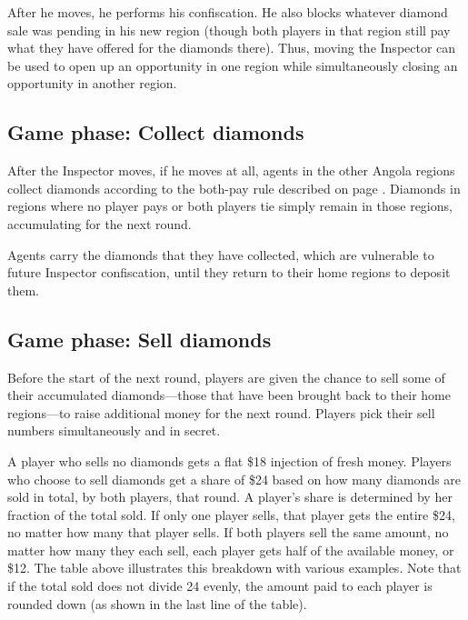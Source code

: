 \documentclass[8pt]{extbook}
\begin{document}
After he moves, he performs his confiscation.  He also blocks whatever diamond sale was pending in his new region (though both players in that region still pay what they have offered for the diamonds there).  Thus, moving the Inspector can be used to open up an opportunity in one region while simultaneously closing an opportunity in another region.

\subsection{Game phase:  Collect diamonds}
\label{sec:collectPhase}

After the Inspector moves, if he moves at all, agents in the other Angola regions collect diamonds according to the both-pay rule described on page \pageref{sec:aboutBids}.  Diamonds in regions where no player pays or both players tie simply remain in those regions, accumulating for the next round.

Agents carry the diamonds that they have collected, which are vulnerable to future Inspector confiscation, until they return to their home regions to deposit them.


\subsection{Game phase:  Sell diamonds}
\label{sec:sellPhase}

Before the start of the next round, players are given the chance to sell some of their accumulated diamonds---those that have been brought back to their home regions---to raise additional money for the next round.  Players pick their sell numbers simultaneously and in secret.

A player who sells no diamonds gets a flat \$18 injection of fresh money.  Players who choose to sell diamonds get a share of \$24 based on how many diamonds are sold in total, by both players, that round.  A player's share is determined by her fraction of the total sold.  If only one player sells, that player gets the entire \$24, no matter how many that player sells.  If both players sell the same amount, no matter how many they each sell, each player gets half of the available money, or \$12.  The table above illustrates this breakdown with various examples.  Note that if the total sold does not divide 24 evenly, the amount paid to each player is rounded down (as shown in the last line of the table).
\end{document}
